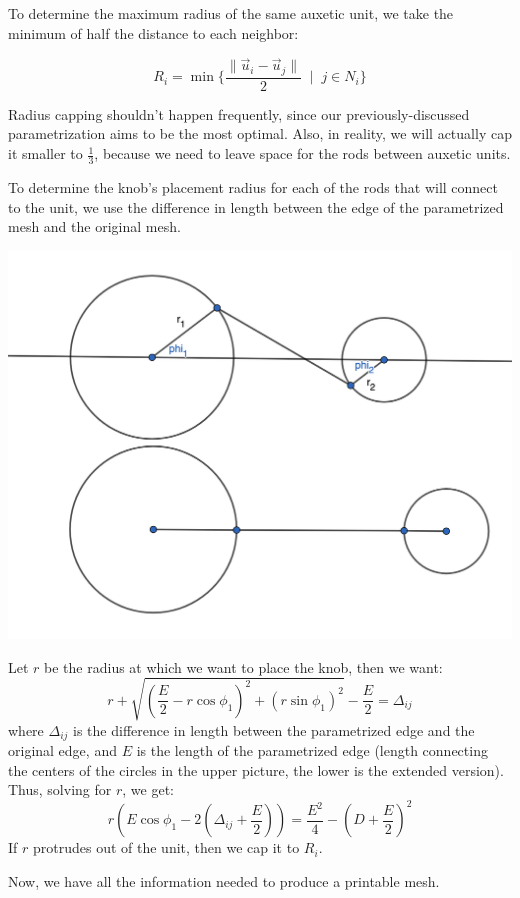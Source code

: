 \documentclass{article}
\begin{document}
To determine the maximum radius of the same auxetic unit, we take the minimum of half the distance to each neighbor:

$$R_i = \min\{\frac{\lVert \vec{u}_i - \vec{u}_j \rVert}{2} \; \mid \; j \in N_i\}$$

Radius capping shouldn't happen frequently, since our previously-discussed parametrization aims to be the most optimal. Also, in reality, we will actually cap it smaller to $\frac{1}{3}$, because we need to leave space for the rods between auxetic units.

To determine the knob's placement radius for each of the rods that will connect to the unit, we use the difference in length between the edge of the parametrized mesh and the original mesh.

\includegraphics[scale=0.18]{geo-calc.png}

Let $r$ be the radius at which we want to place the knob, then we want:
$$r + \sqrt{(\frac{E}{2} - r \cos \phi_1)^2 + (r \sin \phi_1)^2} - \frac{E}{2} = \Delta_{ij}$$
where $\Delta_{ij}$ is the difference in length between the parametrized edge and the original edge, and $E$ is the length of the parametrized edge (length connecting the centers of the circles in the upper picture, the lower is the extended version). Thus, solving for $r$, we get:
$$r (E \cos \phi_1 - 2(\Delta_{ij} + \frac{E}{2})) = \frac{E^2}{4} - (D + \frac{E}{2})^2$$
If $r$ protrudes out of the unit, then we cap it to $R_i$.

Now, we have all the information needed to produce a printable mesh.
\end{document}

